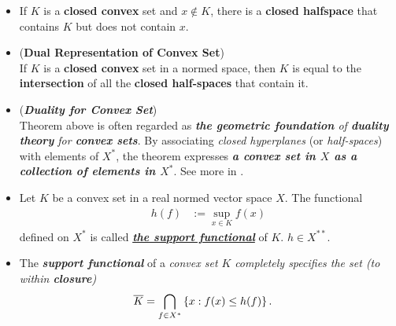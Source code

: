 \documentclass[11pt]{article}
\begin{document}
\begin{itemize}
\item \begin{corollary}
If $K$ is a \textbf{closed convex} set and $x \not\in K$, there is a \textbf{closed halfspace} that contains $K$ but does not contain $x$.
\end{corollary}

\item \begin{theorem} (\textbf{Dual Representation of Convex Set})\citep{luenberger1997optimization, rockafellar1970convex} \\
If $K$ is a \textbf{closed convex} set in a normed space, then $K$ is equal to the \textbf{intersection} of all the \textbf{closed half-spaces} that contain it. 
\end{theorem}

\item \begin{remark} (\emph{\textbf{Duality for Convex Set}})\\
Theorem above is often regarded as \emph{\textbf{the geometric foundation} of \textbf{duality theory} for \textbf{convex sets}}. By associating \emph{closed hyperplanes} (or \textit{half-spaces}) with elements of $X^{*}$, the theorem expresses \emph{\textbf{a convex set in $X$ as a collection of elements in $X^{*}$}}. See more in \citep{rockafellar1970convex}.
\end{remark}

\item \begin{definition}
Let $K$ be a convex set in a real normed vector space $X$. The functional
\begin{align*}
h(f) &:= \sup_{x \in K}f(x)
\end{align*} defined on $X^{*}$ is called \underline{\emph{\textbf{the support functional}}} of $K$. $h \in X^{**}$.
\end{definition}

\item \begin{remark}
The \emph{\textbf{support functional}} of a \emph{convex set $K$} \emph{completely specifies the set (to within \textbf{closure})}
\begin{align*}
\overline{K} &= \bigcap_{f \in X^{*}}\left\{x: f(x) \le h(f)\right\}.
\end{align*}
\end{remark}
\end{itemize}
\end{document}

